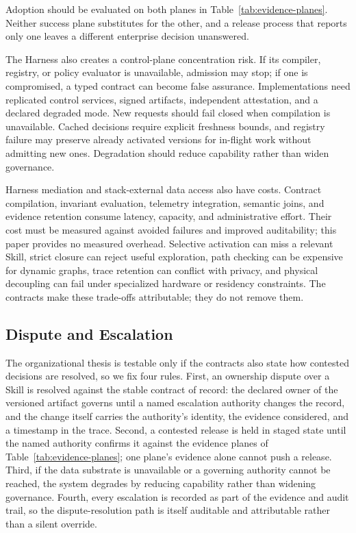 \documentclass[11pt]{article}
\begin{document}
Adoption should be evaluated on both planes in Table~\ref{tab:evidence-planes}. Neither success plane substitutes for the other, and a release process that reports only one leaves a different enterprise decision unanswered.

The Harness also creates a control-plane concentration risk. If its compiler, registry, or policy evaluator is unavailable, admission may stop; if one is compromised, a typed contract can become false assurance. Implementations need replicated control services, signed artifacts, independent attestation, and a declared degraded mode. New requests should fail closed when compilation is unavailable. Cached decisions require explicit freshness bounds, and registry failure may preserve already activated versions for in-flight work without admitting new ones. Degradation should reduce capability rather than widen governance.

Harness mediation and stack-external data access also have costs. Contract compilation, invariant evaluation, telemetry integration, semantic joins, and evidence retention consume latency, capacity, and administrative effort. Their cost must be measured against avoided failures and improved auditability; this paper provides no measured overhead. Selective activation can miss a relevant Skill, strict closure can reject useful exploration, path checking can be expensive for dynamic graphs, trace retention can conflict with privacy, and physical decoupling can fail under specialized hardware or residency constraints. The contracts make these trade-offs attributable; they do not remove them.

\subsection{Dispute and Escalation}

The organizational thesis is testable only if the contracts also state how contested decisions are resolved, so we fix four rules. First, an ownership dispute over a Skill is resolved against the stable contract of record: the declared owner of the versioned artifact governs until a named escalation authority changes the record, and the change itself carries the authority's identity, the evidence considered, and a timestamp in the trace. Second, a contested release is held in staged state until the named authority confirms it against the evidence planes of Table~\ref{tab:evidence-planes}; one plane's evidence alone cannot push a release. Third, if the data substrate is unavailable or a governing authority cannot be reached, the system degrades by reducing capability rather than widening governance. Fourth, every escalation is recorded as part of the evidence and audit trail, so the dispute-resolution path is itself auditable and attributable rather than a silent override.
\end{document}
